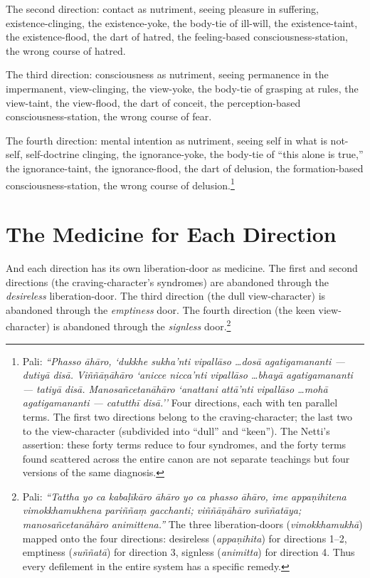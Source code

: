 The second direction: contact as nutriment, seeing pleasure in suffering, existence-clinging, the existence-yoke, the body-tie of ill-will, the existence-taint, the existence-flood, the dart of hatred, the feeling-based consciousness-station, the wrong course of hatred.

The third direction: consciousness as nutriment, seeing permanence in the impermanent, view-clinging, the view-yoke, the body-tie of grasping at rules, the view-taint, the view-flood, the dart of conceit, the perception-based consciousness-station, the wrong course of fear.

The fourth direction: mental intention as nutriment, seeing self in what is not-self, self-doctrine clinging, the ignorance-yoke, the body-tie of ``this alone is true,'' the ignorance-taint, the ignorance-flood, the dart of delusion, the formation-based consciousness-station, the wrong course of delusion.\footnote{Pali: \textit{``Phasso āhāro, `dukkhe sukha'nti vipallāso \ldots dosā agatigamananti --- dutiyā disā. Viññāṇāhāro `anicce nicca'nti vipallāso \ldots bhayā agatigamananti --- tatiyā disā. Manosañcetanāhāro `anattani attā'nti vipallāso \ldots mohā agatigamananti --- catutthī disā.''} Four directions, each with ten parallel terms. The first two directions belong to the craving-character; the last two to the view-character (subdivided into ``dull'' and ``keen''). The Netti's assertion: these forty terms reduce to four syndromes, and the forty terms found scattered across the entire canon are not separate teachings but four versions of the same diagnosis.}

\section*{The Medicine for Each Direction}

And each direction has its own liberation-door as medicine. The first and second directions (the craving-character's syndromes) are abandoned through the \textit{desireless} liberation-door. The third direction (the dull view-character) is abandoned through the \textit{emptiness} door. The fourth direction (the keen view-character) is abandoned through the \textit{signless} door.\footnote{Pali: \textit{``Tattha yo ca kabaḷīkāro āhāro yo ca phasso āhāro, ime appaṇihitena vimokkhamukhena pariññaṃ gacchanti; viññāṇāhāro suññatāya; manosañcetanāhāro animittena.''} The three liberation-doors (\textit{vimokkhamukhā}) mapped onto the four directions: desireless (\textit{appaṇihita}) for directions 1--2, emptiness (\textit{suññatā}) for direction 3, signless (\textit{animitta}) for direction 4. Thus every defilement in the entire system has a specific remedy.}

